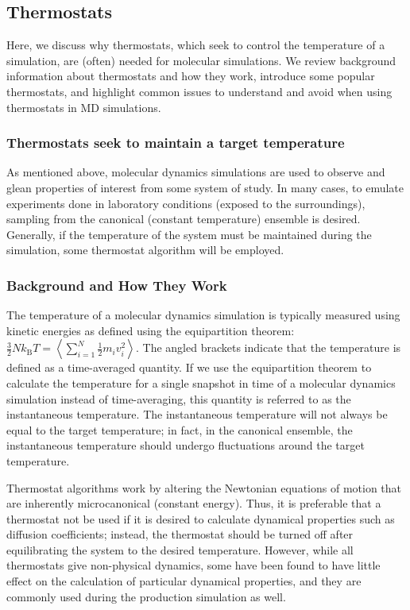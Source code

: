 \documentclass[9pt,bestpractices]{livecoms}
\begin{document}
\subsection{Thermostats}
\label{sec:thermostats}

Here, we discuss why thermostats, which seek to control the temperature of a simulation, are (often) needed for molecular simulations. 
We review background information about thermostats and how they work, introduce some popular thermostats, and highlight common issues to understand and avoid when using thermostats in MD simulations.

\subsubsection{Thermostats seek to maintain a target temperature}
As mentioned above, molecular dynamics simulations are used to observe and glean properties of interest from some system of study.
In many cases, to emulate experiments done in laboratory conditions (exposed to the surroundings), sampling from the canonical (constant temperature) ensemble is desired\cite{thermostatAlgorithms2005}.
Generally, if the temperature of the system must be maintained during the simulation, some thermostat algorithm will be employed. 


\subsubsection{Background and How They Work}

The temperature of a molecular dynamics simulation is typically measured using kinetic energies as defined using the equipartition theorem: $\frac{3}{2} N k_{\text{B}} T = \left<\sum_{i=1}^{N} \frac{1}{2} m_i v_i^2\right>$.
The angled brackets indicate that the temperature is defined as a time-averaged quantity.
If we use the equipartition theorem to calculate the temperature for a single snapshot in time of a molecular dynamics simulation instead of time-averaging, this quantity is referred to as the instantaneous temperature.
The instantaneous temperature will not always be equal to the target temperature; in fact, in the canonical ensemble, the instantaneous temperature should undergo fluctuations around the target temperature.

Thermostat algorithms work by altering the Newtonian equations of motion that are inherently microcanonical (constant energy).
Thus, it is preferable that a thermostat not be used if it is desired to calculate dynamical properties such as diffusion coefficients; instead, the thermostat should be turned off after equilibrating the system to the desired temperature.
However, while all thermostats give non-physical dynamics, some have been found to have little effect on the calculation of particular dynamical properties, and they are commonly used during the production simulation as well\cite{Basconi:2013:J.Chem.TheoryComput.}.
\end{document}
